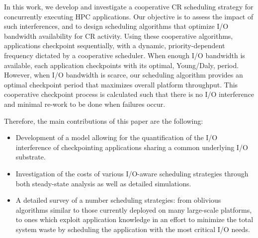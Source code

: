 \documentclass[two]{article}
\begin{document}
In this work, we develop and investigate a cooperative CR scheduling strategy
for concurrently executing HPC applications.  Our objective is to assess the
impact of such interferences, and to design scheduling algorithms that optimize
I/O bandwidth availability for CR activity.  Using these cooperative
algorithms, applications checkpoint sequentially, with a dynamic,
priority-dependent frequency dictated by a cooperative scheduler.  When enough
I/O bandwidth is available, each application checkpoints with its optimal,
Young/Daly, period.  However, when I/O bandwidth is scarce, our scheduling
algorithm provides an optimal checkpoint period that maximizes overall platform
throughput. This cooperative checkpoint process is calculated such that there
is no I/O interference and minimal re-work to be done when failures occur.

Therefore, the main contributions of this paper are the following:

\begin{itemize}

\item Development of a model allowing for the quantification of
the I/O interference of checkpointing applications sharing a common underlying I/O
substrate.

\item Investigation of the costs of various I/O-aware scheduling
strategies through both steady-state analysis as well as detailed simulations.

\item A detailed survey of a number scheduling strategies: from oblivious
algorithms similar to  those currently deployed on many large-scale platforms,
to ones which exploit application knowledge in an effort to  minimize the total
system waste by scheduling the application with the most critical I/O needs.

\end{itemize}

\end{document}
